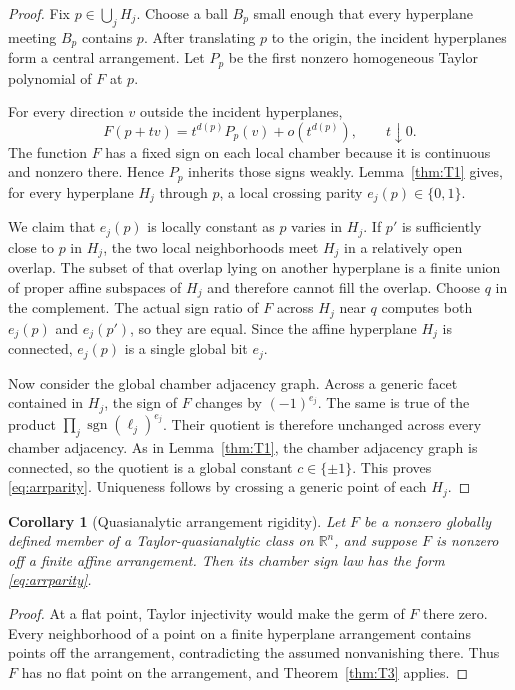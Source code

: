 \documentclass[11pt]{article}
\newtheorem{corollary}[theorem]{Corollary}
\theoremstyle{definition}
\theoremstyle{remark}
\newcommand{\R}{\mathbb{R}}
\newcommand{\bits}{\{0,1\}}
\newcommand{\sign}{\operatorname{sgn}}
\begin{document}
\begin{proof}
Fix $p\in\bigcup_jH_j$. Choose a ball $B_p$ small enough that every hyperplane meeting $B_p$ contains $p$. After translating $p$ to the origin, the incident hyperplanes form a central arrangement. Let $P_p$ be the first nonzero homogeneous Taylor polynomial of $F$ at $p$.

For every direction $v$ outside the incident hyperplanes,
\[
 F(p+tv)=t^{d(p)}P_p(v)+o(t^{d(p)}),
 \qquad t\downarrow0.
\]
The function $F$ has a fixed sign on each local chamber because it is continuous and nonzero there. Hence $P_p$ inherits those signs weakly. Lemma~\ref{thm:T1} gives, for every hyperplane $H_j$ through $p$, a local crossing parity $e_j(p)\in\bits$.

We claim that $e_j(p)$ is locally constant as $p$ varies in $H_j$. If $p'$ is sufficiently close to $p$ in $H_j$, the two local neighborhoods meet $H_j$ in a relatively open overlap. The subset of that overlap lying on another hyperplane is a finite union of proper affine subspaces of $H_j$ and therefore cannot fill the overlap. Choose $q$ in the complement. The actual sign ratio of $F$ across $H_j$ near $q$ computes both $e_j(p)$ and $e_j(p')$, so they are equal. Since the affine hyperplane $H_j$ is connected, $e_j(p)$ is a single global bit $e_j$.

Now consider the global chamber adjacency graph. Across a generic facet contained in $H_j$, the sign of $F$ changes by $(-1)^{e_j}$. The same is true of the product $\prod_j\sign(\ell_j)^{e_j}$. Their quotient is therefore unchanged across every chamber adjacency. As in Lemma~\ref{thm:T1}, the chamber adjacency graph is connected, so the quotient is a global constant $c\in\{\pm1\}$. This proves \eqref{eq:arrparity}. Uniqueness follows by crossing a generic point of each $H_j$.
\end{proof}

\begin{corollary}[Quasianalytic arrangement rigidity]\label{cor:quasiarr}
Let $F$ be a nonzero globally defined member of a Taylor-quasianalytic class on $\R^n$, and suppose $F$ is nonzero off a finite affine arrangement. Then its chamber sign law has the form \eqref{eq:arrparity}.
\end{corollary}

\begin{proof}
At a flat point, Taylor injectivity would make the germ of $F$ there zero. Every neighborhood of a point on a finite hyperplane arrangement contains points off the arrangement, contradicting the assumed nonvanishing there. Thus $F$ has no flat point on the arrangement, and Theorem~\ref{thm:T3} applies.
\end{proof}
\end{document}
